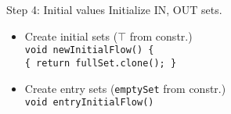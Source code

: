 





\begin{slide}{Step 4: Initial values}
\vspace*{-0.1in}
Initialize IN, OUT sets.
\begin{itemize}

\item Create initial sets ($\top$ from constr.)\\
{\tt void newInitialFlow() \{\\
\qquad \tt \{ return fullSet.clone(); \} }

\vspace*{0.1in}

\item Create entry sets ({\tt emptySet} from constr.)\\
{\tt void entryInitialFlow()}\\
\end{itemize}
\end{slide}



